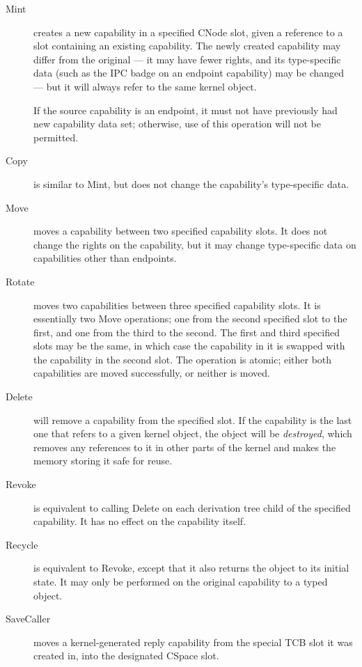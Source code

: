 \begin{description}
\item[Mint] creates a new capability in a specified CNode slot, given a
reference to a slot containing an existing capability. The newly created
capability may differ from the original --- it may have fewer rights, and its
type-specific data (such as the IPC badge on an endpoint capability) may be
changed ---  but it will always refer to the same kernel object.

If the source capability is an endpoint, it must not have previously had
new capability data set; otherwise, use of this operation will not be permitted.

\item[Copy] is similar to Mint, but does not change the capability's
type-specific data.

\item[Move] moves a capability between two specified capability slots. It does
not change the rights on the capability, but it may change type-specific data
on capabilities other than endpoints.

\item[Rotate] moves two capabilities between three specified capability slots. It is essentially two Move operations; one from the second specified slot to the first, and one from the third to the second. The first and third specified slots may be the same, in which case the capability in it is swapped with the capability in the second slot. The operation is atomic; either both capabilities are moved successfully, or neither is moved.

\item[Delete] will remove a capability from the specified slot. If the capability is the last one that refers to a given kernel object, the object will be \emph{destroyed}, which removes any references to it in other parts of the kernel and makes the memory storing it safe for reuse.

\item[Revoke] is equivalent to calling Delete on each derivation tree
child of the specified capability. It has no effect on the capability itself.

\item[Recycle] is equivalent to Revoke, except that it also returns the object to its initial state. It may only be performed on the original capability to a typed object.

\item[SaveCaller] moves a kernel-generated reply capability from the special TCB slot it was created in, into the designated CSpace slot.
\end{description}


